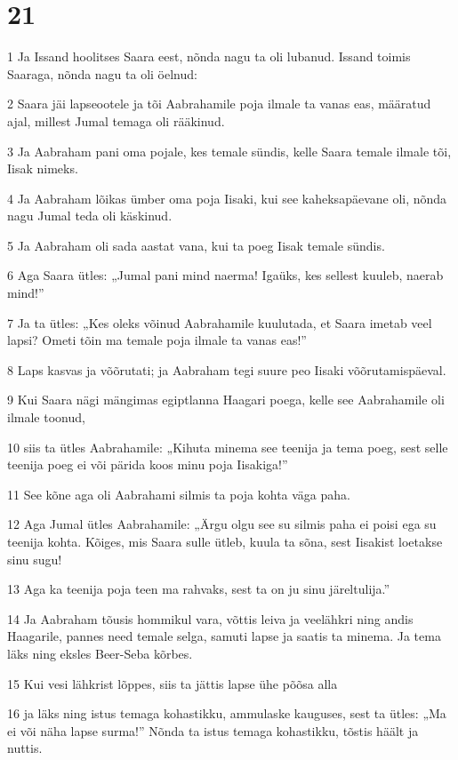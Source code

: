 \chapter{21}

\par 1 Ja Issand hoolitses Saara eest, nõnda nagu ta oli lubanud. Issand toimis Saaraga, nõnda nagu ta oli öelnud:
\par 2 Saara jäi lapseootele ja tõi Aabrahamile poja ilmale ta vanas eas, määratud ajal, millest Jumal temaga oli rääkinud.
\par 3 Ja Aabraham pani oma pojale, kes temale sündis, kelle Saara temale ilmale tõi, Iisak nimeks.
\par 4 Ja Aabraham lõikas ümber oma poja Iisaki, kui see kaheksapäevane oli, nõnda nagu Jumal teda oli käskinud.
\par 5 Ja Aabraham oli sada aastat vana, kui ta poeg Iisak temale sündis.
\par 6 Aga Saara ütles: „Jumal pani mind naerma! Igaüks, kes sellest kuuleb, naerab mind!”
\par 7 Ja ta ütles: „Kes oleks võinud Aabrahamile kuulutada, et Saara imetab veel lapsi? Ometi tõin ma temale poja ilmale ta vanas eas!”
\par 8 Laps kasvas ja võõrutati; ja Aabraham tegi suure peo Iisaki võõrutamispäeval.
\par 9 Kui Saara nägi mängimas egiptlanna Haagari poega, kelle see Aabrahamile oli ilmale toonud,
\par 10 siis ta ütles Aabrahamile: „Kihuta minema see teenija ja tema poeg, sest selle teenija poeg ei või pärida koos minu poja Iisakiga!”
\par 11 See kõne aga oli Aabrahami silmis ta poja kohta väga paha.
\par 12 Aga Jumal ütles Aabrahamile: „Ärgu olgu see su silmis paha ei poisi ega su teenija kohta. Kõiges, mis Saara sulle ütleb, kuula ta sõna, sest Iisakist loetakse sinu sugu!
\par 13 Aga ka teenija poja teen ma rahvaks, sest ta on ju sinu järeltulija.”
\par 14 Ja Aabraham tõusis hommikul vara, võttis leiva ja veelähkri ning andis Haagarile, pannes need temale selga, samuti lapse ja saatis ta minema. Ja tema läks ning eksles Beer-Seba kõrbes.
\par 15 Kui vesi lähkrist lõppes, siis ta jättis lapse ühe põõsa alla
\par 16 ja läks ning istus temaga kohastikku, ammulaske kauguses, sest ta ütles: „Ma ei või näha lapse surma!” Nõnda ta istus temaga kohastikku, tõstis häält ja nuttis.
